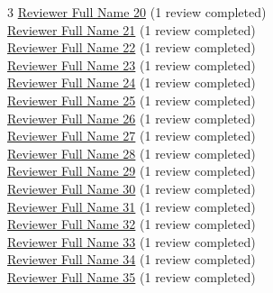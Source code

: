 \begin{multicols}{3}
\href{https://orcid.org/0000-0001-2345-6789}{Reviewer Full Name 20} (1 review completed)\\
\href{https://orcid.org/0000-0001-2345-6789}{Reviewer Full Name 21} (1 review completed)\\
\href{https://orcid.org/0000-0001-2345-6789}{Reviewer Full Name 22} (1 review completed)\\
\href{https://orcid.org/0000-0001-2345-6789}{Reviewer Full Name 23} (1 review completed)\\
\href{https://orcid.org/0000-0001-2345-6789}{Reviewer Full Name 24} (1 review completed)\\
\href{https://orcid.org/0000-0001-2345-6789}{Reviewer Full Name 25} (1 review completed)\\
\href{https://orcid.org/0000-0001-2345-6789}{Reviewer Full Name 26} (1 review completed)\\
\href{https://orcid.org/0000-0001-2345-6789}{Reviewer Full Name 27} (1 review completed)\\
\href{https://orcid.org/0000-0001-2345-6789}{Reviewer Full Name 28} (1 review completed)\\
\href{https://orcid.org/0000-0001-2345-6789}{Reviewer Full Name 29} (1 review completed)\\
\href{https://orcid.org/0000-0001-2345-6789}{Reviewer Full Name 30} (1 review completed)\\
\href{https://orcid.org/0000-0001-2345-6789}{Reviewer Full Name 31} (1 review completed)\\
\href{https://orcid.org/0000-0001-2345-6789}{Reviewer Full Name 32} (1 review completed)\\
\href{https://orcid.org/0000-0001-2345-6789}{Reviewer Full Name 33} (1 review completed)\\
\href{https://orcid.org/0000-0001-2345-6789}{Reviewer Full Name 34} (1 review completed)\\
\href{https://orcid.org/0000-0001-2345-6789}{Reviewer Full Name 35} (1 review completed)\\
\end{multicols}

